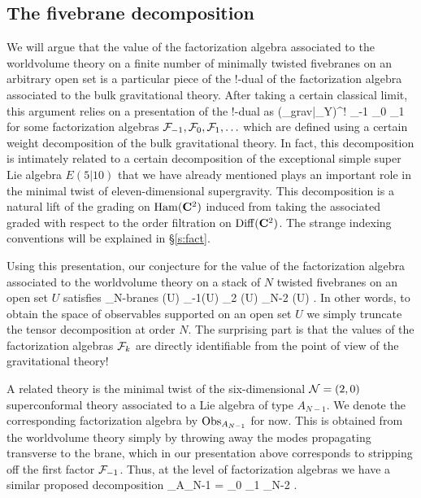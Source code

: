 \subsection{The fivebrane decomposition}
We will argue that the value of the factorization algebra associated to the worldvolume theory on a finite number of minimally twisted fivebranes on an arbitrary open set is a particular piece of the $!$-dual of the factorization algebra associated to the bulk gravitational theory.
After taking a certain classical limit, this argument relies on a presentation of the $!$-dual as
\beqn
(\Obs_{grav}|_{Y})^{!} \simeq \cF_{-1} \otimes \cF_0 \otimes \cF_1 \otimes \cdots 
\eeqn
for some factorization algebras $\mathcal F_{-1},\mathcal F_0, \mathcal F_{1},\ldots$ which are defined using a certain weight decomposition of the bulk gravitational theory.
In fact, this decomposition is intimately related to a certain decomposition of the exceptional simple super Lie algebra $E(5|10)$ that we have already mentioned plays an important role in the minimal twist of eleven-dimensional supergravity. This decomposition is a natural lift of the grading on $\operatorname{Ham}(\mathbf{C}^{2})$ induced from taking the associated graded with respect to the order filtration on $\operatorname{Diff} (\mathbf{C}^{2})$. The strange indexing conventions will be explained in \S\ref{s:fact}.

Using this presentation, our conjecture for the value of the factorization algebra associated to the worldvolume theory on a stack of $N$ twisted fivebranes on an open set $U$ satisfies
\beqn\label{eqn:finiteTensor}
\Obs_{N-branes} (U) \simeq \cF_{-1}(U) \otimes \cF_2 (U) \otimes \cdots \otimes \cF_{N-2} (U) .
\eeqn
In other words, to obtain the space of observables supported on an open set $U$ we simply truncate the tensor decomposition at order $N$.
The surprising part is that the values of the factorization algebras $\mathcal F_k$ are directly identifiable from the point of view of the gravitational theory!

A related theory is the minimal twist of the six-dimensional $\mathcal N=(2,0)$ superconformal theory associated to a Lie algebra of type $A_{N-1}$.
We denote the corresponding factorization algebra by $\operatorname{Obs}_{A_{N-1}}$ for now. 
This is obtained from the worldvolume theory simply by throwing away the modes propagating transverse to the brane, which in our presentation above corresponds to stripping off the first factor $\mathcal F_{-1}$. 
Thus, at the level of factorization algebras we have a similar proposed decomposition
\beqn
\label{eqn:AN-1}
\Obs_{A_{N-1}} = \cF_0 \otimes \cF_1 \otimes \cdots \otimes \cF_{N-2} .
\eeqn

